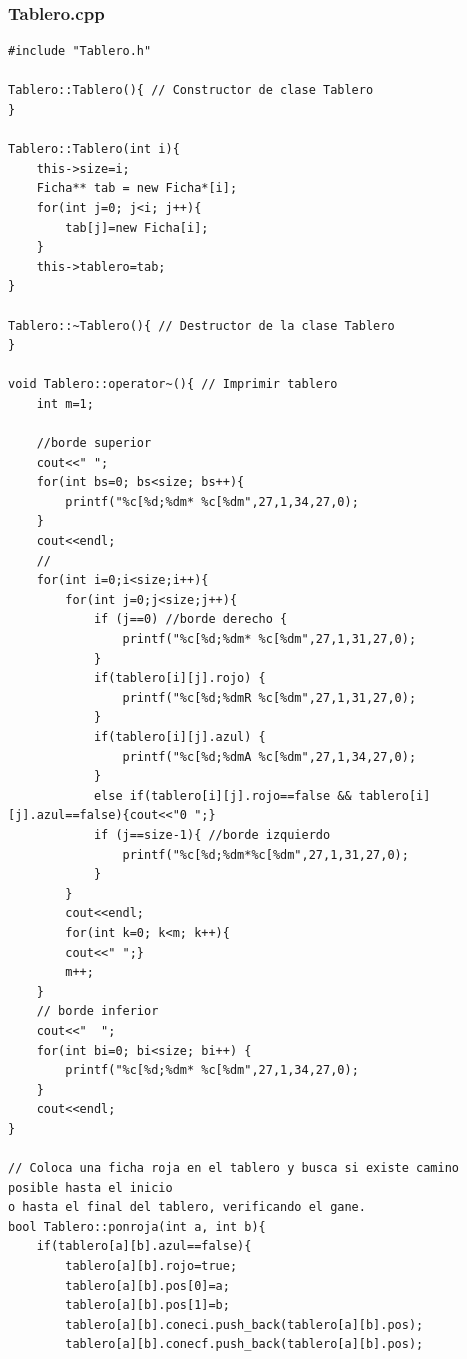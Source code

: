 \documentclass[12pt,letterpaper]{article}
\begin{document}
\subsubsection*{Tablero.cpp}
\begin{lstlisting}
#include "Tablero.h"

Tablero::Tablero(){ // Constructor de clase Tablero	
}

Tablero::Tablero(int i){
	this->size=i;
	Ficha** tab = new Ficha*[i];
	for(int j=0; j<i; j++){
		tab[j]=new Ficha[i];
	}
	this->tablero=tab;
}

Tablero::~Tablero(){ // Destructor de la clase Tablero
}

void Tablero::operator~(){ // Imprimir tablero
	int m=1;
	
	//borde superior
	cout<<" ";
	for(int bs=0; bs<size; bs++){
		printf("%c[%d;%dm* %c[%dm",27,1,34,27,0);
	}
	cout<<endl;
    //
	for(int i=0;i<size;i++){
		for(int j=0;j<size;j++){
			if (j==0) //borde derecho {
				printf("%c[%d;%dm* %c[%dm",27,1,31,27,0);	
			}
			if(tablero[i][j].rojo) {
				printf("%c[%d;%dmR %c[%dm",27,1,31,27,0);
			}
			if(tablero[i][j].azul) {
				printf("%c[%d;%dmA %c[%dm",27,1,34,27,0);
			}
			else if(tablero[i][j].rojo==false && tablero[i][j].azul==false){cout<<"0 ";}
			if (j==size-1){ //borde izquierdo
				printf("%c[%d;%dm*%c[%dm",27,1,31,27,0);
			}	
		}	
		cout<<endl;
		for(int k=0; k<m; k++){
		cout<<" ";}
		m++;
	}
	// borde inferior
	cout<<"  ";
	for(int bi=0; bi<size; bi++) {
		printf("%c[%d;%dm* %c[%dm",27,1,34,27,0);
	} 
	cout<<endl;
}
	
// Coloca una ficha roja en el tablero y busca si existe camino posible hasta el inicio
o hasta el final del tablero, verificando el gane.
bool Tablero::ponroja(int a, int b){
	if(tablero[a][b].azul==false){
		tablero[a][b].rojo=true;
		tablero[a][b].pos[0]=a;
		tablero[a][b].pos[1]=b;
		tablero[a][b].coneci.push_back(tablero[a][b].pos);
		tablero[a][b].conecf.push_back(tablero[a][b].pos);
		

\end{lstlisting}
\end{document}
